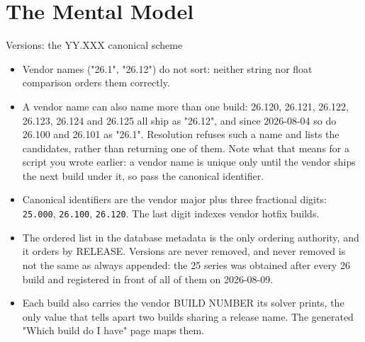\documentclass[aspectratio=169,10pt]{beamer}
\newcommand{\code}[1]{\texttt{\small #1}}
\begin{document}
\section{The Mental Model}

\begin{frame}{Versions: the YY.XXX canonical scheme}
  \small
    \begin{itemize}
      \item Vendor names ("26.1", "26.12") do not sort: neither string nor float comparison orders them correctly.
      \item A vendor name can also name more than one build: 26.120, 26.121, 26.122, 26.123, 26.124 and 26.125 all ship as "26.12", and since 2026-08-04 so do 26.100 and 26.101 as "26.1". Resolution refuses such a name and lists the candidates, rather than returning one of them. Note what that means for a script you wrote earlier: a vendor name is unique only until the vendor ships the next build under it, so pass the canonical identifier.
      \item Canonical identifiers are the vendor major plus three fractional digits: \code{25.000}, \code{26.100}, \code{26.120}. The last digit indexes vendor hotfix builds.
      \item The ordered list in the database metadata is the only ordering authority, and it orders by RELEASE. Versions are never removed, and never removed is not the same as always appended: the 25 series was obtained after every 26 build and registered in front of all of them on 2026-08-09.
      \item Each build also carries the vendor BUILD NUMBER its solver prints, the only value that tells apart two builds sharing a release name. The generated "Which build do I have" page maps them.
    \end{itemize}
\end{frame}
\end{document}
